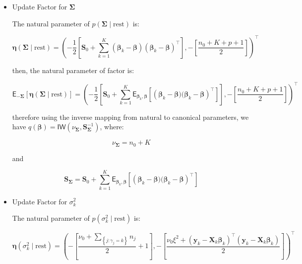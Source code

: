 \begin{appendix}
\begin{itemize}
and

\begin{equation}
\bm{\mu}_{\bm{\beta}}= \left[\bm{\Lambda}_0^{-1}   + \sum_{k=1}^{K}\mathsf{E}_{\bm{\Sigma}}\left[\bm{\Sigma}^{-1}\right]  \right]^{-1}\left[\bm{\Lambda}_0^{-1} \bm{\mu}_0 + \sum_{k=1}^{K}\mathsf{E}_{\bm{\Sigma}}\left[\bm{\Sigma}^{-1}\right] \mathsf{E}_{\bm{\beta}_k}\left[\bm{\beta}_k \right]\right]
\end{equation}

\item Update Factor for $\bm{\Sigma}$

The natural parameter of $p(\bm{\Sigma}\mid \text{rest}) $ is:

\begin{equation}
\bm{\eta}(\bm{\Sigma}\mid \text{rest})=\left(-\frac{1}{2}\left[ \bm{S}_0 + \sum_{k=1}^{K} (\bm{\beta}_k - \bm{\beta})(\bm{\beta}_k - \bm{\beta})^\top\right],-\left[\frac{n_0 + K + p + 1}{2}\right]\right)^\top
\end{equation}

then, the natural parameter of factor is:

\begin{equation}
\mathsf{E}_{-\bm{\Sigma}}\left[\bm{\eta}(\bm{\Sigma}\mid \text{rest})\right]=\left(-\frac{1}{2}\left[ \bm{S}_0 + \sum_{k=1}^{K} \mathsf{E}_{\bm{\beta}_k,\bm{\beta}}\left[\left(\bm{\beta}_k - \bm{\beta})(\bm{\beta}_k - \bm{\beta}\right)^\top\right]\right],-\left[\frac{n_0 + K + p + 1}{2}\right]\right)^\top
\end{equation}

therefore using the inverse mapping from natural to canonical parameters, we have $q(\bm{\beta})=\mathsf{IW}(\nu_{\bm{\Sigma}},\bm{S}_{\bm{\Sigma}}^{-1})$, where:

\begin{equation}
\nu_{\bm{\Sigma}} = n_0+K
\end{equation}

and

\begin{equation}
\bm{S}_{\bm{\Sigma}}= \bm{S}_0 + \sum_{k=1}^{K} \mathsf{E}_{\bm{\beta}_k,\bm{\beta}}\left[\left(\bm{\beta}_k - \bm{\beta})(\bm{\beta}_k - \bm{\beta}\right)^\top\right]
\end{equation}

\item Update Factor for $\sigma_k^2$

The natural parameter of $p(\sigma_k^2\mid \text{rest}) $ is:

\begin{equation}
\bm{\eta}(\sigma_k^2\mid \text{rest})=\left(-\left[\frac{\nu_0+\sum_{\left\lbrace j : \gamma_j = k\right\rbrace}n_j }{2}+1\right],-\left[ \frac{ \nu_0 \xi^2 +  (\bm{y}_{k} - \bm{X}_{k} \bm{\beta}_k)^\top(\bm{y}_{k} - \bm{X}_{k} \bm{\beta}_k)}{2}\right]\right)^\top
\end{equation}


\end{itemize}
\end{appendix}
